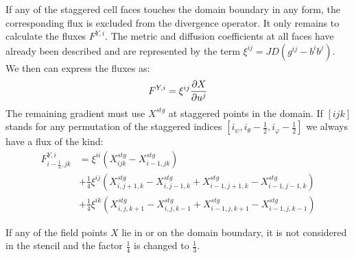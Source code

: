 If any of the staggered cell faces touches the domain boundary in any form, the corresponding flux is excluded from the divergence operator. It only remains to calculate the fluxes $F^{Y,i}$. The metric and diffusion coefficients at all faces have already been described and are represented by the term $\xi^{ij}=JD(g^{ij}-b^ib^j)$. We then can express the fluxes as: 
$$ F^{Y,i} = \xi^{ij}\pdv{X}{u^j} $$
The remaining gradient must use $X^{stg}$ at staggered points in the domain. If $[ijk]$ stands for any permutation of the staggered indices $[i_\psi,i_\theta-\frac{1}{2},i_\varphi-\frac{1}{2}]$ we always have a flux of the kind:
\begin{align*}
	F^{Y,i}_{i-\frac{1}{2},jk} &= \xi^{ii}\left(X^{stg}_{ijk}-X^{stg}_{i-1,jk}\right) \\
	&+ \frac{1}{4}\xi^{ij}\left(X^{stg}_{i,j+1,k}-X^{stg}_{i,j-1,k}+X^{stg}_{i-1,j+1,k}-X^{stg}_{i-1,j-1,k}\right) \\
	&+ \frac{1}{4}\xi^{ik}\left(X^{stg}_{i,j,k+1}-X^{stg}_{i,j,k-1}+X^{stg}_{i-1,j,k+1}-X^{stg}_{i-1,j,k-1}\right)
\end{align*}

If any of the field points $X$ lie in or on the domain boundary, it is not considered in the stencil and the factor $\frac{1}{4}$ is changed to $\frac{1}{3}$.




